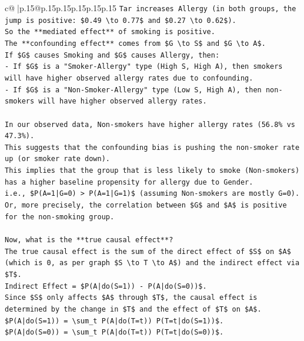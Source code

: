\documentclass{article}
\begin{document}
{\begin{supertabular}{c@{$\;$}|p{.15\linewidth}@{}p{.15\linewidth}p{.15\linewidth}p{.15\linewidth}p{.15\linewidth}p{.15\linewidth}}
{{{\texttt{Tar increases Allergy (in both groups, the jump is positive: \$0.49 \textbackslash{}to 0.77\$ and \$0.27 \textbackslash{}to 0.62\$).} \\
\texttt{So the **mediated effect** of smoking is positive.} \\
\texttt{The **confounding effect** comes from \$G \textbackslash{}to S\$ and \$G \textbackslash{}to A\$.} \\
\texttt{If \$G\$ causes Smoking and \$G\$ causes Allergy, then:} \\
\texttt{{-} If \$G\$ is a "Smoker{-}Allergy" type (High S, High A), then smokers will have higher observed allergy rates due to confounding.} \\
\texttt{{-} If \$G\$ is a "Non{-}Smoker{-}Allergy" type (Low S, High A), then non{-}smokers will have higher observed allergy rates.} \\
\\ 
\texttt{In our observed data, Non{-}smokers have higher allergy rates (56.8\% vs 47.3\%).} \\
\texttt{This suggests that the confounding bias is pushing the non{-}smoker rate up (or smoker rate down).} \\
\texttt{This implies that the group that is less likely to smoke (Non{-}smokers) has a higher baseline propensity for allergy due to Gender.} \\
\texttt{i.e., \$P(A=1|G=0) > P(A=1|G=1)\$ (assuming Non{-}smokers are mostly G=0).} \\
\texttt{Or, more precisely, the correlation between \$G\$ and \$A\$ is positive for the non{-}smoking group.} \\
\\ 
\texttt{Now, what is the **true causal effect**?} \\
\texttt{The true causal effect is the sum of the direct effect of \$S\$ on \$A\$ (which is 0, as per graph \$S \textbackslash{}to T \textbackslash{}to A\$) and the indirect effect via \$T\$.} \\
\texttt{Indirect Effect = \$P(A|do(S=1)) {-} P(A|do(S=0))\$.} \\
\texttt{Since \$S\$ only affects \$A\$ through \$T\$, the causal effect is determined by the change in \$T\$ and the effect of \$T\$ on \$A\$.} \\
\texttt{\$P(A|do(S=1)) = \textbackslash{}sum\_t P(A|do(T=t)) P(T=t|do(S=1))\$.} \\
\texttt{\$P(A|do(S=0)) = \textbackslash{}sum\_t P(A|do(T=t)) P(T=t|do(S=0))\$.} \\
}}}
\end{supertabular}}
\end{document}
